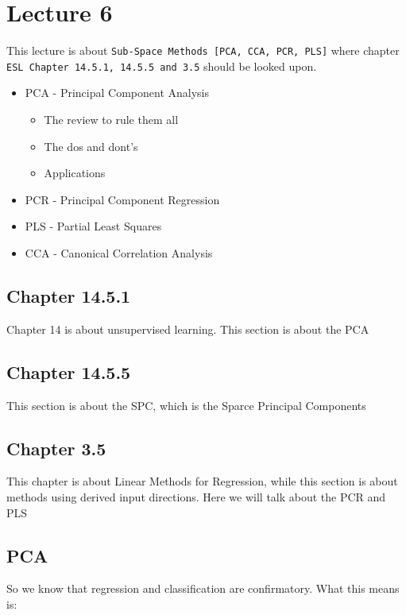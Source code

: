 \chapter{Lecture 6}

This lecture is about \texttt{Sub-Space Methods
[PCA, CCA, PCR, PLS]} where chapter \texttt{ESL Chapter 14.5.1,
14.5.5 and 3.5} should be looked upon.

\begin{itemize}
  \item PCA - Principal Component Analysis
  \begin{itemize}
    \item The review to rule them all
    \item The dos and dont's
    \item Applications
  \end{itemize}
  \item PCR - Principal Component Regression
  \item PLS - Partial Least Squares
  \item CCA - Canonical Correlation Analysis
\end{itemize}

\section{Chapter 14.5.1}

Chapter 14 is about unsupervised learning. This section is about the PCA

\section{Chapter 14.5.5}

This section is about the SPC, which is the Sparce Principal Components

\section{Chapter 3.5}

This chapter is about Linear Methods for Regression, while this section is about methods using derived input directions. Here we will talk about the PCR and PLS

\section{PCA}

So we know that regression and classification are confirmatory. What this means is:

